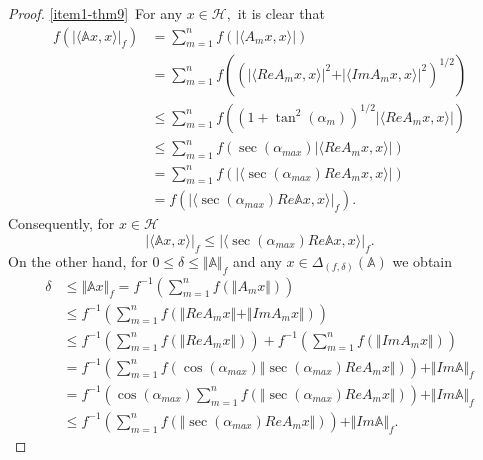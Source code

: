 \documentclass[10pt,a4paper]{amsart}
\begin{document}
\begin{proof}
 \noindent \ref{item1-thm9}\ For any $ x\in \mathcal{H},
 $ it is clear that
\begin{align*}
f\left(  \vert \langle \mathbb{A}x,x \rangle \vert_{f}\right) &= \sum\limits_{m=1}^{n} f\left(  \vert \langle A_{m}x,x \rangle \vert\right) \\
&= \sum\limits_{m=1}^{n} f\left( \left( \vert \langle ReA_{m}x,x\rangle \vert^{2} + \vert \langle ImA_{m}x,x\rangle \vert^{2}\right) ^{1/2} \right) \\
&\leq \sum\limits_{m=1}^{n} f \left( \left( 1+\tan^{2}(\alpha_{m}) \right)^{1/2} \vert \langle ReA_{m}x,x\rangle \vert \right) \\
&\leq \sum\limits_{m=1}^{n} f \left( \sec(\alpha_{max})\vert \langle ReA_{m}x,x\rangle \vert \right) \\
&= \sum\limits_{m=1}^{n} f \left( \vert \langle \sec(\alpha_{max})ReA_{m}x,x\rangle \vert \right) \\
&= f \left( \vert \langle \sec(\alpha_{max})Re\mathbb{A}x,x\rangle \vert_{f}\right).
\end{align*}
Consequently, for $ x\in \mathcal{H}$
\begin{equation}
\label{equ20}
\vert \langle \mathbb{A} x,x \rangle \vert_{f}\leq \vert \langle \sec(\alpha_{max})Re\mathbb{A}x,x\rangle \vert_{f}.
\end{equation}
On the other hand, for $ 0\leq\delta\leq \Vert  \mathbb{A} \Vert_{f} $ and any $ x\in \Delta_{(f,\delta)}( \mathbb{A}) $ we obtain
\begin{align*}
\delta &\leq \Vert \mathbb{A} x \Vert_{f} = f^{-1}\left( \sum\limits_{m=1}^{n}f\left( \Vert A_{m}x \Vert \right)  \right) \\
&\leq f^{-1} \left( \sum\limits_{m=1}^{n}f\left( \Vert ReA_{m}x \Vert + \Vert Im A_{m}x \Vert \right)  \right) \\
&\leq f^{-1} \left( \sum\limits_{m=1}^{n}f\left( \Vert ReA_{m}x \Vert \right)  \right)+f^{-1} \left( \sum\limits_{m=1}^{n}f\left( \Vert Im A_{m}x \Vert \right)  \right) \\
&= f^{-1} \left( \sum\limits_{m=1}^{n}f\left( \cos(\alpha_{max})\Vert \sec(\alpha_{max})ReA_{m}x \Vert \right)  \right)+ \Vert Im \mathbb{A} \Vert_{f}\\
&= f^{-1}\left( \cos(\alpha_{max})\sum\limits_{m=1}^{n}f\left( \Vert \sec(\alpha_{max})ReA_{m}x \Vert \right)  \right) + \Vert Im \mathbb{A} \Vert_{f} \\
&\leq f^{-1}\left(\sum\limits_{m=1}^{n}f\left( \Vert \sec(\alpha_{max})ReA_{m}x \Vert \right)  \right) + \Vert Im \mathbb{A} \Vert_{f}.

\end{align*}
\end{proof}
\end{document}
